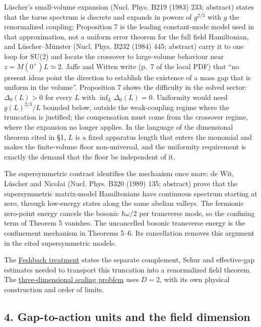 \documentclass[11pt,a4paper]{article}
\begin{document}
Lüscher's small-volume expansion (Nucl. Phys. B219 (1983) 233; abstract)
states that the torus spectrum is discrete and expands in powers of
\(g^{2/3}\) with \(g\) the renormalized coupling; Proposition 7 is the
leading constant-mode model used in that approximation, not a uniform
error theorem for the full field Hamiltonian, and Lüscher--Münster
(Nucl. Phys. B232 (1984) 445; abstract) carry it to one loop for SU(2)
and locate the crossover to large-volume behaviour near
\(z=M(0^+)L\simeq2\). Jaffe and Witten write (p.~7 of the local PDF)
that ``no present ideas point the direction to establish the existence
of a mass gap that is uniform in the volume''. Proposition 7 shows the
difficulty in the solved sector: \(\Delta_0(L)>0\) for every \(L\) with
\(\inf_L\Delta_0(L)=0\). Uniformity would need \(g(L)^{2/3}/L\) bounded
below, outside the weak-coupling regime where the truncation is
justified; the compensation must come from the crossover regime, where
the expansion no longer applies. In the language of the dimensional
theorem cited in §1, \(L\) is a fixed apparatus length that enters the
monomial and makes the finite-volume floor non-universal, and the
uniformity requirement is exactly the demand that the floor be
independent of it.

The supersymmetric contrast identifies the mechanism once more: de Wit,
Lüscher and Nicolai (Nucl. Phys. B320 (1989) 135; abstract) prove that
the supersymmetric matrix-model Hamiltonians have continuous spectrum
starting at zero, through low-energy states along the same abelian
valleys. The fermionic zero-point energy cancels the bosonic
\(\hbar\omega/2\) per transverse mode, so the confining term of Theorem
5 vanishes. The uncancelled bosonic transverse energy is the confinement
mechanism in Theorems 5--6. Its cancellation removes this argument in
the cited supersymmetric models.

The \href{weak-coupling-feshbach-reduction.md}{Feshbach treatment}
states the separate complement, Schur and effective-gap estimates needed
to transport this truncation into a renormalized field theorem. The
\href{three-dimensional-gap-one-function.md}{three-dimensional scaling
problem} uses \(D=2\), with its own physical construction and order of
limits.

\hypertarget{gap-to-action-units-and-the-field-dimension}{%
\subsection{4. Gap-to-action units and the field
dimension}\label{gap-to-action-units-and-the-field-dimension}}
\end{document}
